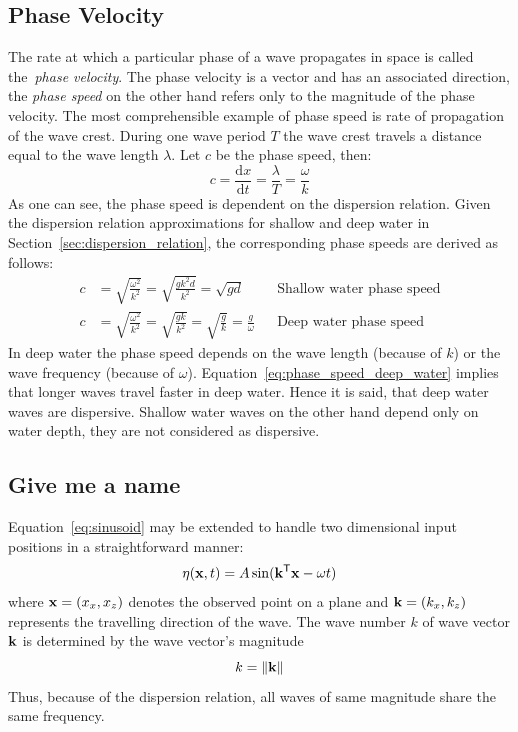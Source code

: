\subsection{Phase Velocity}
\label{sec:phase_velocity}
The rate at which a particular phase of a wave propagates in space is called the~\emph{phase velocity}.
The phase velocity is a vector and has an associated direction, the \emph{phase speed} on the other hand
refers only to the magnitude of the phase velocity. The most comprehensible example of phase speed
is rate of propagation of the wave crest. During one wave period $T$ the wave crest travels a distance
equal to the wave length $\lambda$. Let $c$ be the phase speed, then:
%
\begin{equation}
 c = \frac{\mathrm dx}{\mathrm dt} = \frac{\lambda}{T} = \frac{\omega}{k}
\end{equation}
%
As one can see, the phase speed is dependent on the dispersion relation. Given the dispersion relation
approximations for shallow and deep water in Section~\ref{sec:dispersion_relation}, the corresponding
phase speeds are derived as follows:
%
\begin{align}
 c &= \sqrt{\frac{\omega^2}{k^2}} = \sqrt{\frac{gk^2d}{k^2}} = \sqrt{gd} && \text{Shallow water phase speed}\\ \label{eq:phase_speed_shallow_water}
 c &= \sqrt{\frac{\omega^2}{k^2}} = \sqrt{\frac{gk}{k^2}} = \sqrt{\frac{g}{k}} = \frac{g}{\omega} && \text{Deep water phase speed} \label{eq:phase_speed_deep_water}
\end{align}
%
In deep water the phase speed depends on the wave length (because of $k$) or the wave frequency (because of $\omega$).
Equation~\ref{eq:phase_speed_deep_water} implies that longer waves travel faster in deep water. Hence it is said, that
deep water waves are dispersive. Shallow water waves on the other hand depend only on water depth, they are not considered
as dispersive.

\subsection{Give me a name}
Equation~\ref{eq:sinusoid} may be extended to handle two dimensional input positions in a straightforward manner:
\begin{equation}
 \eta(\mathbf{x}, t) = A\sin(\mathbf{k}^{\mathsf{T}}\mathbf{x} - \omega t)
\end{equation}
where $\mathbf{x} = (x_x, x_z)$ denotes the observed point on a plane and $\mathbf{k} = (k_x, k_z)$ represents
the travelling direction of the wave. The wave number $k$ of wave vector $\mathbf{k}$ is determined by the wave vector's
magnitude
\begin{equation}
 k = \lVert\mathbf{k}\rVert
\end{equation}
Thus, because of the dispersion relation, all waves of same magnitude share the same frequency.


